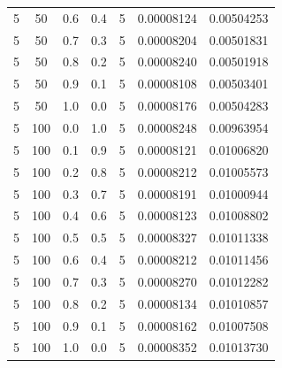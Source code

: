 \documentclass[12pt, a4paper]{report}
\begin{document}
\begin{table} [H]
\begin{tabular}[l]{|c c c c c c c|}
			5 & 50 & 0.6 & 0.4 & 5 & 0.00008124 & 0.00504253 \\
			
			5 & 50 & 0.7 & 0.3 & 5 & 0.00008204 & 0.00501831 \\
			
			5 & 50 & 0.8 & 0.2 & 5 & 0.00008240 & 0.00501918 \\
			
			5 & 50 & 0.9 & 0.1 & 5 & 0.00008108 & 0.00503401 \\
			
			5 & 50 & 1.0 & 0.0 & 5 & 0.00008176 & 0.00504283 \\
			
			5 & 100 & 0.0 & 1.0 & 5 & 0.00008248 & 0.00963954 \\
			
			5 & 100 & 0.1 & 0.9 & 5 & 0.00008121 & 0.01006820 \\
			
			5 & 100 & 0.2 & 0.8 & 5 & 0.00008212 & 0.01005573 \\
			
			5 & 100 & 0.3 & 0.7 & 5 & 0.00008191 & 0.01000944 \\
			
			5 & 100 & 0.4 & 0.6 & 5 & 0.00008123 & 0.01008802 \\
			
			5 & 100 & 0.5 & 0.5 & 5 & 0.00008327 & 0.01011338 \\
			
			5 & 100 & 0.6 & 0.4 & 5 & 0.00008212 & 0.01011456 \\
			
			5 & 100 & 0.7 & 0.3 & 5 & 0.00008270 & 0.01012282 \\
			
			5 & 100 & 0.8 & 0.2 & 5 & 0.00008134 & 0.01010857 \\
			
			5 & 100 & 0.9 & 0.1 & 5 & 0.00008162 & 0.01007508 \\
			
			5 & 100 & 1.0 & 0.0 & 5 & 0.00008352 & 0.01013730 \\\hline
		\end{tabular}
	\end{table}
	
\end{document}
